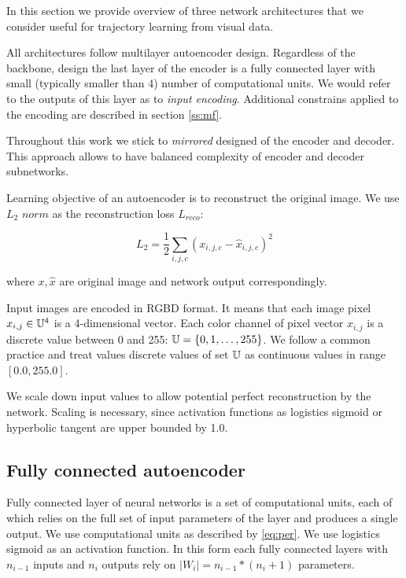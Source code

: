 In this section we provide overview of three network architectures that we consider useful for trajectory learning from visual data.

All architectures follow multilayer autoencoder design.
Regardless of the backbone, design the last layer of the encoder is a fully connected layer with small (typically smaller than 4) number of computational units.
We would refer to the outputs of this layer as to  \textit{input encoding}.
Additional constrains applied to the encoding are described in section \ref{ss:mf}.

Throughout this work we stick to \textit{mirrored} designed of the encoder and decoder.
This approach allows to have balanced complexity of encoder and decoder subnetworks.

Learning objective of an autoencoder is to reconstruct the original image.
We use $L_2$ $norm$ as the reconstruction loss $L_{reco}$:

\begin{equation}
  L_{2} = \frac{1}{2} \sum_{i, j, c} (x_{i,j,c} - \hat{x}_{i,j,c})^2
\end{equation}

where $x, \hat{x}$ are original image and network output correspondingly.

Input images are encoded in RGBD format. It means that each image pixel $x_{i,j} \in \Bbb{U}^4$ is a 4-dimensional vector.
Each color channel of pixel vector $x_{i,j}$ is a discrete value between 0 and 255: $\Bbb{U} = \{0, 1, \ldots, 255 \}$.
We follow a common practice and treat values discrete values of set $\Bbb{U}$ as continuous values in range $[0.0, 255.0]$.

We scale down input values to allow potential perfect reconstruction by the network.
Scaling is necessary, since activation functions as logistics sigmoid or hyperbolic tangent are upper bounded by 1.0.


\subsection{Fully connected autoencoder}

Fully connected layer of neural networks is a set of computational units, each of which relies on the full set of input parameters of the layer and produces a single output.
We use computational units as described by \ref{eq:per}. We use logistics sigmoid as an activation function.
In this form each fully connected layers with $n_{i-1}$ inputs and $n_i$ outputs rely on $|W_i|=n_{i-1}*(n_i+1)$ parameters.

